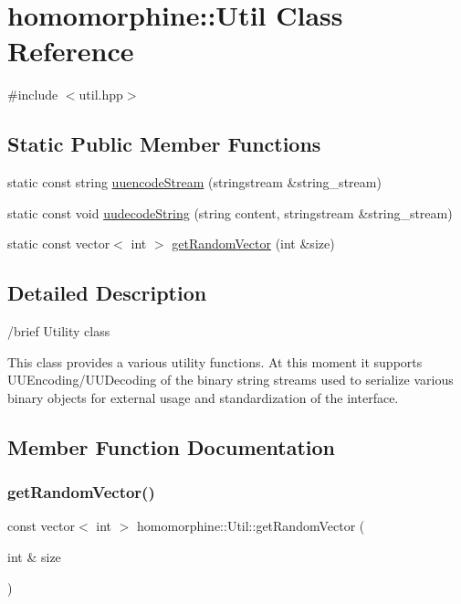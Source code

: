 \hypertarget{classhomomorphine_1_1_util}{}\section{homomorphine\+:\+:Util Class Reference}
\label{classhomomorphine_1_1_util}


{\ttfamily \#include $<$util.\+hpp$>$}

\subsection*{Static Public Member Functions}
\begin{DoxyCompactItemize}
\item 
static const string \hyperlink{classhomomorphine_1_1_util_a26f29995aa48f4374993ec4afeca2ac8}{uuencode\+Stream} (stringstream \&string\+\_\+stream)
\item 
static const void \hyperlink{classhomomorphine_1_1_util_aba5af6d7356aca8c70ae4fb1e5d36b70}{uudecode\+String} (string content, stringstream \&string\+\_\+stream)
\item 
static const vector$<$ int $>$ \hyperlink{classhomomorphine_1_1_util_a2dcf1d83028f3d47ba49b80696fefef7}{get\+Random\+Vector} (int \&size)
\end{DoxyCompactItemize}


\subsection{Detailed Description}
/brief Utility class

This class provides a various utility functions. At this moment it supports U\+U\+Encoding/\+U\+U\+Decoding of the binary string streams used to serialize various binary objects for external usage and standardization of the interface. 

\subsection{Member Function Documentation}
\mbox{\label{classhomomorphine_1_1_util_a2dcf1d83028f3d47ba49b80696fefef7}} 
\subsubsection{\texorpdfstring{get\+Random\+Vector()}{getRandomVector()}}
{\footnotesize\ttfamily const vector$<$ int $>$ homomorphine\+::\+Util\+::get\+Random\+Vector (\begin{DoxyParamCaption}\item[{int \&}]{size }\end{DoxyParamCaption})\hspace{0.3cm}{\ttfamily [static]}}

